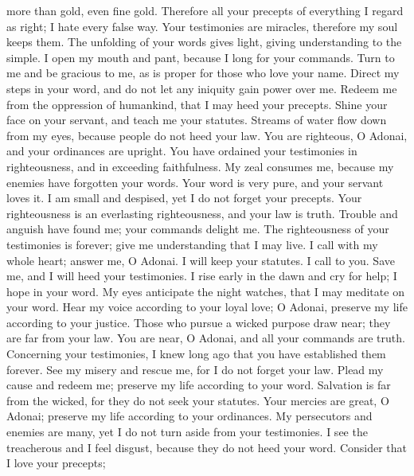 \begin{biblechapter}
more than gold, even fine gold.
\verse Therefore all your precepts of everything I regard as right; 
I hate every false way.
 Your testimonies are miracles, 
therefore my soul keeps them.
\verse The unfolding of your words gives light, 
giving understanding to the simple.
\verse I open my mouth and pant, 
because I long for your commands.
\verse Turn to me and be gracious to me, 
as is proper for those who love your name.
\verse Direct my steps in your word, 
and do not let any iniquity gain power over me.
\verse Redeem me from the oppression of humankind, 
that I may heed your precepts.
\verse Shine your face on your servant, 
and teach me your statutes.
\verse Streams of water flow down from my eyes, 
because people do not heed your law.
 You are righteous, O Adonai, 
and your ordinances are upright.
\verse You have ordained your testimonies in righteousness, 
and in exceeding faithfulness.
\verse My zeal consumes me, 
because my enemies have forgotten your words.
\verse Your word is very pure, 
and your servant loves it.
\verse I am small and despised, 
yet I do not forget your precepts.
\verse Your righteousness is an everlasting righteousness, 
and your law is truth.
\verse Trouble and anguish have found me; 
your commands delight me.
\verse The righteousness of your testimonies is forever; 
give me understanding that I may live.
 I call with my whole heart; answer me, O Adonai. 
I will keep your statutes.
\verse I call to you. Save me, 
and I will heed your testimonies.
\verse I rise early in the dawn and cry for help; 
I hope in your word.
\verse My eyes anticipate the night watches, 
that I may meditate on your word.
\verse Hear my voice according to your loyal love; 
O Adonai, preserve my life according to your justice.
\verse Those who pursue a wicked purpose draw near; 
they are far from your law.
\verse You are near, O Adonai, 
and all your commands are truth.
\verse Concerning your testimonies, I knew long ago 
that you have established them forever.
 See my misery and rescue me, 
for I do not forget your law.
\verse Plead my cause and redeem me; 
preserve my life according to your word.
\verse Salvation is far from the wicked, 
for they do not seek your statutes.
\verse Your mercies are great, O Adonai; 
preserve my life according to your ordinances.
\verse My persecutors and enemies are many, 
yet I do not turn aside from your testimonies.
\verse I see the treacherous and I feel disgust, 
because they do not heed your word.
\verse Consider that I love your precepts; 

\end{biblechapter}
